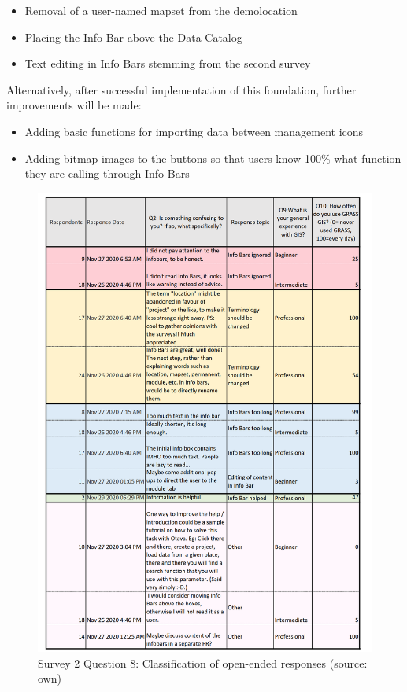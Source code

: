 \documentclass[a4paper,10pt,twoside]{article}
\begin{document}
\begin{itemize}
\item Removal of a user-named mapset from the demolocation
\item Placing the Info Bar above the Data Catalog
\item Text editing in Info Bars stemming from the second survey
\end {itemize}

\noindent Alternatively, after successful implementation of this foundation, further improvements will be made:

\begin {itemize}
\item Adding basic functions for importing data between management icons
\item Adding bitmap images to the buttons so that users know 100\% what function they are calling through Info Bars
\end {itemize}

\newpage
\begin{figure}[hbt!] 
\begin{center}
\includegraphics[width=15cm]{../surveys/analyzed_data/survey2_question8.png} 
\caption[Survey 2 Question 8: Classification of open-ended responses]{Survey 2 Question 8: Classification of open-ended responses (source: own)}
\label{fig:survey2_question8}
\end{center}
\end{figure}
\end{document}
